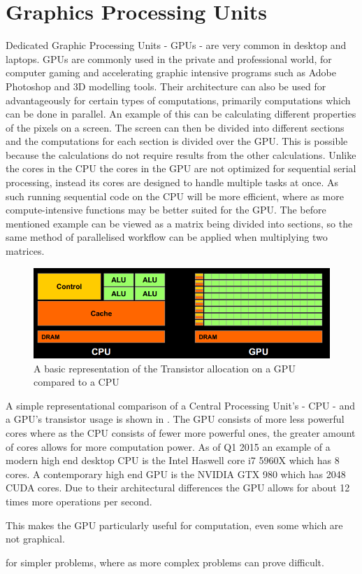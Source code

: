 \section{Graphics Processing Units}
\label{sec:GPU}
Dedicated Graphic Processing Units - GPUs - are very common in desktop and laptops. \citep{STEAMHW}
GPUs are commonly used in the private and professional world, for computer gaming and accelerating graphic intensive programs such as Adobe Photoshop and 3D modelling tools. \citep{NVIDIAADOBE}
Their architecture can also be used for advantageously for certain types of computations, primarily computations which can be done in parallel. 
An example of this can be calculating different properties of the pixels on a screen. 
The screen can then be divided into different sections and the computations for each section is divided over the GPU.
This is possible because the calculations do not require results from the other calculations.
Unlike the cores in the CPU the cores in the GPU are not optimized for sequential serial processing, instead its cores are designed to handle multiple tasks at once. 
As such running sequential code on the CPU will be more efficient, where as more compute-intensive functions may be better suited for the GPU.%
The before mentioned example can be viewed as a matrix being divided into sections, so the same method of parallelised workflow can be applied when multiplying two matrices.

\begin{figure}[h!]
\centering
 \includegraphics[width=1\textwidth]{figures/GPUCPUimage.png} %
\caption{A basic representation of the Transistor allocation on a GPU compared to a CPU}\label{image:GPUCPUimage} %
\vspace{-15pt}
\end{figure}

A simple representational comparison of a Central Processing Unit's - CPU - and a GPU's transistor usage is shown in .
The GPU consists of more less powerful cores where as the CPU consists of fewer more powerful ones, the greater amount of cores allows for more computation power.
As of Q1 2015 an example of a modern high end desktop CPU is the Intel Haswell core i7 5960X which has 8 cores. \citep{puget}
A contemporary high end GPU is the NVIDIA GTX 980 which has 2048 CUDA cores. \citep{techpowerup,gtx980}
Due to their architectural differences the GPU allows for about 12 times more operations per second.

This makes the GPU particularly useful for computation, even some which are not graphical. %



 for simpler problems, where as more complex problems can prove difficult.  